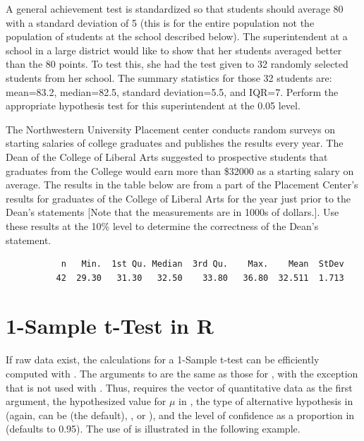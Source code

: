 \documentclass[10pt,openany]{book}\usepackage[]{graphicx}\usepackage[]{color}
\begin{document}
\newpage
\begin{exsection}
  \item \label{revex:tTestSuperInt} A general achievement test is standardized so that students should average 80 with a standard deviation of 5 (this is for the entire population not the population of students at the school described below).  The superintendent at a school in a large district would like to show that her students averaged better than the 80 points.  To test this, she had the test given to 32 randomly selected students from her school.  The summary statistics for those 32 students are: mean=83.2, median=82.5, standard deviation=5.5, and IQR=7.  Perform the appropriate hypothesis test for this superintendent at the 0.05 level. 

  \item \label{revex:tTestLASalary} The Northwestern University Placement center conducts random surveys on starting salaries of college graduates and publishes the results every year.  The Dean of the College of Liberal Arts suggested to prospective students that graduates from the College would earn more than \$32000 as a starting salary on average.  The results in the table below are from a part of the Placement Center's results for graduates of the College of Liberal Arts for the year just prior to the Dean's statements [Note that the measurements are in 1000s of dollars.].  Use these results at the 10\% level to determine the correctness of the Dean's statement. 
  \begin{center}
    \begin{Verbatim}
           n   Min.  1st Qu. Median  3rd Qu.    Max.    Mean  StDev
          42  29.30   31.30   32.50    33.80   36.80  32.511  1.713
    \end{Verbatim}
  \end{center}
\end{exsection}

\section{1-Sample t-Test in R}
\vspace{-12pt}
If raw data exist, the calculations for a 1-Sample t-test can be efficiently computed with . The arguments to  are the same as those for , with the exception that  is not used with .  Thus,  requires the vector of quantitative data as the first argument, the hypothesized value for $\mu$ in , the type of alternative hypothesis in  (again, can be  (the default), , or ), and the level of confidence as a proportion in  (defaults to 0.95). The use of  is illustrated in the following example.
\end{document}
